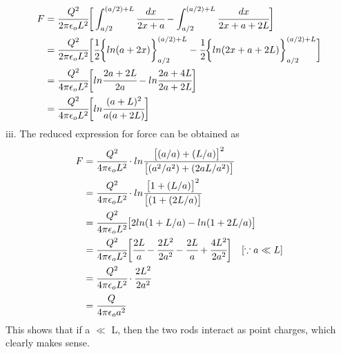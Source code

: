 \begin{align*}
    F &= \cfrac{Q^2}{2 \pi \epsilon_o L^2} \bigg[\int_{a/2}^{(a/2)+L}\cfrac{dx}{2x+a} - \int_{a/2}^{(a/2)+L}\cfrac{dx}{2x + a + 2L}\bigg ]\\
      &= \cfrac{Q^2}{2 \pi \epsilon_o L^2} \bigg[\cfrac{1}{2} \bigg\{ln(a+2x)\bigg\}_{a/2}^{(a/2)+L} - \cfrac{1}{2} \bigg\{ln (2x + a + 2L)\bigg\}_{a/2}^{(a/2)+L}\bigg]\\
      &= \cfrac{Q^2}{4 \pi \epsilon_o L^2} \bigg[ln\cfrac{2a +2L}{2a} - ln\cfrac{2a + 4L}{2a + 2L}\bigg]\\
      &= \cfrac{Q^2}{4 \pi \epsilon_o L^2} \bigg[ln\cfrac{(a + L)^2}{a(a + 2L)} \bigg]
\end{align*}
iii. The reduced expression for force can be obtained as
\begin{align*}
    F &= \cfrac{Q^2}{4 \pi \epsilon_o L^2} \cdot ln\cfrac{\big[(a/a) + (L/a)\big]^2} {\big[(a^2/a^2) + (2aL/a^2)\big]} \\
      &= \cfrac{Q^2}{4 \pi \epsilon_o L^2} \cdot ln\cfrac{\big[1 + (L/a)\big]^2} {\big[(1 + (2L/a)\big]}\\
      &= \cfrac{Q^2}{4 \pi \epsilon_o L^2} \big[2 ln(1 + L/a) - ln (1 + 2L/a)\big] \\
      &= \cfrac{Q^2}{4 \pi \epsilon_o L^2} \bigg[\cfrac{2L}{a} - \cfrac{2L^2}{2a^2} - \cfrac{2L}{a} + \cfrac{4L^2}{2a^2} \bigg ] \hspace{10pt} [\because a\ll L]\\
      &= \cfrac{Q^2}{4 \pi \epsilon_o L^2} \cdot \cfrac{2L^2}{2a^2}\\
      &= \cfrac{Q}{4 \pi \epsilon_o a^2}
\end{align*}
This shows that if a $\ll$ L, then the two rods interact as point charges, which clearly makes sense.

